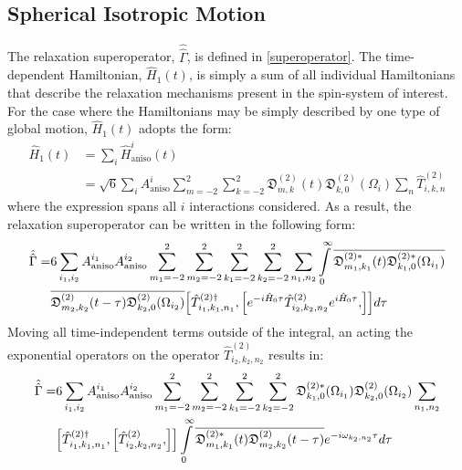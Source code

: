 \subsection{Spherical Isotropic Motion} \label{SphericalSuperoperator}
The relaxation superoperator, $\hat{\hat{\Gamma}}$, is defined in \ref{superoperator}. The time-dependent Hamiltonian, $\hat{H}_1 (t)$, is simply a sum of all individual Hamiltonians that describe the relaxation mechanisms present in the spin-system of interest. For the case where the Hamiltonians may be simply described by one type of global motion, $\hat{H}_1 (t)$ adopts the form:
\begin{equation}
\begin{split}
\hat{H}_1 (t) &= \sum \limits_{i} \hat{H}_{\text{aniso}}^i (t)\\
&= \sqrt{6} \sum \limits_{i} A_{\text{aniso}}^i \sum \limits_{m = -2}^2 \sum \limits_{k = -2}^2 \mathfrak{D}_{m,k}^{(2)}(t) \mathfrak{D}_{k,0}^{(2)} (\Omega_i) \sum \limits_{n} \hat{T}_{i,k,n}^{(2)}
\end{split}
\end{equation}
where the expression spans all $i$ interactions considered. As a result, the relaxation superoperator can be written in the following form:
\begin{equation}
\begin{split}
\hat{\hat{\Gamma}} = &6 \sum \limits_{i_1, i_2} A_{\text{aniso}}^{i_1} A_{\text{aniso}}^{i_{2}} \sum \limits_{m_{1} = -2}^2 \sum \limits_{m_2 = -2}^2 \sum \limits_{k_1 = -2}^2 \sum \limits_{k_2 = -2}^2 \sum \limits_{n_1, n_2} \int \limits_0^{\infty} \overline{\mathfrak{D}_{m_1,k_1}^{(2)*}(t) \mathfrak{D}_{k_1,0}^{(2)*} (\Omega_{i_1})} \\
& \overline{\mathfrak{D}_{m_2,k_2}^{(2)}(t - \tau) \mathfrak{D}_{k_2,0}^{(2)} (\Omega_{i_2})} \comm{\hat{T}_{i_1, k_1, n_1}^{(2) \dagger}}{\comm{e^{-i \hat{H}_0 \tau}\hat{T}_{i_2, k_2, n_2}^{(2)} e^{i \hat{H}_0 \tau}}{}} d \tau
\end{split}
\end{equation}
Moving all time-independent terms outside of the integral, an acting the exponential operators on the operator $\hat{T}_{i_2, k_2, n_2}^{(2)}$ results in:
\begin{equation}
\begin{split}
\hat{\hat{\Gamma}} = &6 \sum \limits_{i_1, i_2} A_{\text{aniso}}^{i_1} A_{\text{aniso}}^{i_{2}} \sum \limits_{m_{1} = -2}^2 \sum \limits_{m_2 = -2}^2 \sum \limits_{k_1 = -2}^2 \sum \limits_{k_2 = -2}^2 \mathfrak{D}_{k_1,0}^{(2)*} (\Omega_{i_1}) \mathfrak{D}_{k_2,0}^{(2)} (\Omega_{i_2}) \sum \limits_{n_1, n_2} \\
& \comm{\hat{T}_{i_1, k_1, n_1}^{(2) \dagger}}{\comm{\hat{T}_{i_2, k_2, n_2}^{(2)}}{}} \int \limits_0^{\infty} \overline{\mathfrak{D}_{m_1,k_1}^{(2)*}(t) \mathfrak{D}_{m_2,k_2}^{(2)}(t - \tau)} e^{-i \omega_{k_2, n_2} \tau} d \tau
\end{split}
\end{equation}
